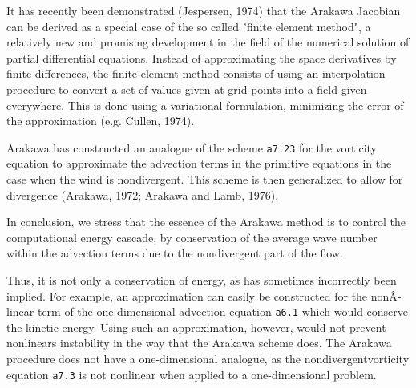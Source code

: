 It has recently been demonstrated (Jespersen, 1974) that the Arakawa
Jacobian can be derived as a special case of the so called "finite
element method", a relatively new and promising development in the field
of the numerical solution of partial differential equations. Instead of
approximating the space derivatives by finite differences, the finite
element method consists of using an interpolation procedure to convert a
set of values given at grid points into a field given everywhere. This
is done using a variational formulation, minimizing the error of the
approximation (e.g. Cullen, 1974).

Arakawa has constructed an analogue of the scheme \texttt{a7.23} for the
vorticity equation to approximate the advection terms in the primitive
equations in the case when the wind is nondivergent. This scheme is then
generalized to allow for divergence (Arakawa, 1972; Arakawa and Lamb,
1976).

In conclusion, we stress that the essence of the Arakawa method is to
control the computational energy cascade, by conservation of the average
wave number within the advection terms due to the nondivergent part of
the flow.

Thus, it is not only a conservation of energy, as has sometimes
incorrectly been implied. For example, an approximation can easily be
constructed for the nonÂ­linear term of the one-dimensional advection
equation \texttt{a6.1} which would conserve the kinetic energy. Using
such an approximation, however, would not prevent nonlinears instability
in the way that the Arakawa scheme does. The Arakawa procedure does not
have a one-dimensional analogue, as the nondivergentvorticity equation
\texttt{a7.3} is not nonlinear when applied to a one-dimensional
problem.
